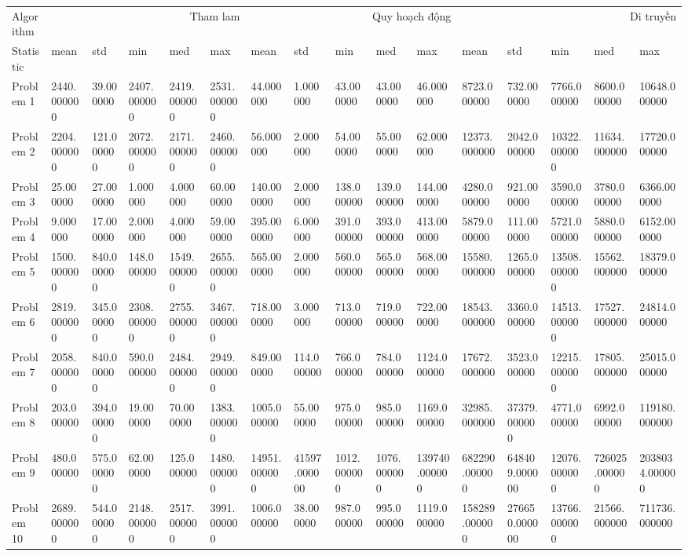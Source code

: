 \begin{tabular}{llllllllllllllll}
\toprule
Algorithm & \multicolumn{5}{r}{Tham lam} & \multicolumn{5}{r}{Quy hoạch động} & \multicolumn{5}{r}{Di truyền} \\
Statistic & mean & std & min & med & max & mean & std & min & med & max & mean & std & min & med & max \\
\midrule
Problem 1 & 2440.000000 & 39.000000 & 2407.000000 & 2419.000000 & 2531.000000 & 44.000000 & 1.000000 & 43.000000 & 43.000000 & 46.000000 & 8723.000000 & 732.000000 & 7766.000000 & 8600.000000 & 10648.000000 \\
Problem 2 & 2204.000000 & 121.000000 & 2072.000000 & 2171.000000 & 2460.000000 & 56.000000 & 2.000000 & 54.000000 & 55.000000 & 62.000000 & 12373.000000 & 2042.000000 & 10322.000000 & 11634.000000 & 17720.000000 \\
Problem 3 & 25.000000 & 27.000000 & 1.000000 & 4.000000 & 60.000000 & 140.000000 & 2.000000 & 138.000000 & 139.000000 & 144.000000 & 4280.000000 & 921.000000 & 3590.000000 & 3780.000000 & 6366.000000 \\
Problem 4 & 9.000000 & 17.000000 & 2.000000 & 4.000000 & 59.000000 & 395.000000 & 6.000000 & 391.000000 & 393.000000 & 413.000000 & 5879.000000 & 111.000000 & 5721.000000 & 5880.000000 & 6152.000000 \\
Problem 5 & 1500.000000 & 840.000000 & 148.000000 & 1549.000000 & 2655.000000 & 565.000000 & 2.000000 & 560.000000 & 565.000000 & 568.000000 & 15580.000000 & 1265.000000 & 13508.000000 & 15562.000000 & 18379.000000 \\
Problem 6 & 2819.000000 & 345.000000 & 2308.000000 & 2755.000000 & 3467.000000 & 718.000000 & 3.000000 & 713.000000 & 719.000000 & 722.000000 & 18543.000000 & 3360.000000 & 14513.000000 & 17527.000000 & 24814.000000 \\
Problem 7 & 2058.000000 & 840.000000 & 590.000000 & 2484.000000 & 2949.000000 & 849.000000 & 114.000000 & 766.000000 & 784.000000 & 1124.000000 & 17672.000000 & 3523.000000 & 12215.000000 & 17805.000000 & 25015.000000 \\
Problem 8 & 203.000000 & 394.000000 & 19.000000 & 70.000000 & 1383.000000 & 1005.000000 & 55.000000 & 975.000000 & 985.000000 & 1169.000000 & 32985.000000 & 37379.000000 & 4771.000000 & 6992.000000 & 119180.000000 \\
Problem 9 & 480.000000 & 575.000000 & 62.000000 & 125.000000 & 1480.000000 & 14951.000000 & 41597.000000 & 1012.000000 & 1076.000000 & 139740.000000 & 682290.000000 & 648409.000000 & 12076.000000 & 726025.000000 & 2038034.000000 \\
Problem 10 & 2689.000000 & 544.000000 & 2148.000000 & 2517.000000 & 3991.000000 & 1006.000000 & 38.000000 & 987.000000 & 995.000000 & 1119.000000 & 158289.000000 & 276650.000000 & 13766.000000 & 21566.000000 & 711736.000000 \\
\bottomrule
\end{tabular}
